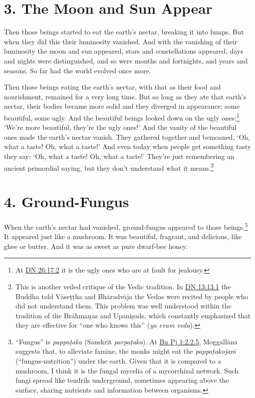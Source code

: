 \documentclass[12pt,openany]{book}%
\begin{document}
\section*{3. The Moon and Sun Appear }

Then those beings started to eat the earth’s nectar, breaking it into lumps. But when they did this their luminosity vanished. And with the vanishing of their luminosity the moon and sun appeared, stars and constellations appeared, days and nights were distinguished, and so were months and fortnights, and years and seasons. So far had the world evolved once more. 

Then those beings eating the earth’s nectar, with that as their food and nourishment, remained for a very long time. But so long as they ate that earth’s nectar, their bodies became more solid and they diverged in appearance; some beautiful, some ugly. And the beautiful beings looked down on the ugly ones:\footnote{At \href{https://suttacentral.net/dn26/en/sujato\#17.2}{DN 26:17.2} it is the ugly ones who are at fault for jealousy. } ‘We’re more beautiful, they’re the ugly ones!’ And the vanity of the beautiful ones made the earth’s nectar vanish. They gathered together and bemoaned, ‘Oh, what a taste! Oh, what a taste!’ And even today when people get something tasty they say: ‘Oh, what a taste! Oh, what a taste!’ They’re just remembering an ancient primordial saying, but they don’t understand what it means.\footnote{This is another veiled critique of the Vedic tradition. In \href{https://suttacentral.net/dn13/en/sujato\#13.1}{DN 13:13.1} the Buddha told \textsanskrit{Vāseṭṭha} and \textsanskrit{Bhāradvāja} the Vedas were recited by people who did not understand them. This problem was well understood within the tradition of the \textsanskrit{Brāhmaṇas} and \textsanskrit{Upaniṣads}, which constantly emphasized that they are effective for “one who knows this” (\textit{ya evam veda}). } 

\section*{4. Ground-Fungus }

When the earth’s nectar had vanished, ground-fungus appeared to those beings.\footnote{“Fungus” is \textit{\textsanskrit{pappaṭaka}} (Sanskrit \textit{\textsanskrit{parpaṭaka}}). At \href{https://suttacentral.net/pli-tv-bu-vb-pj1/en/sujato\#2.2.5}{Bu Pj 1:2.2.5}, \textsanskrit{Moggallāna} suggests that, to alleviate famine, the monks might eat the \textit{\textsanskrit{pappaṭakojaṁ}} (“fungus-nutrition”) under the earth. Given that it is compared to a mushroom, I think it is the fungal mycelia of a mycorrhizal network. Such fungi spread like tendrils underground, sometimes appearing above the surface, sharing nutrients and information between organisms. } It appeared just like a mushroom. It was beautiful, fragrant, and delicious, like ghee or butter. And it was as sweet as pure dwarf-bee honey. 
\end{document}

